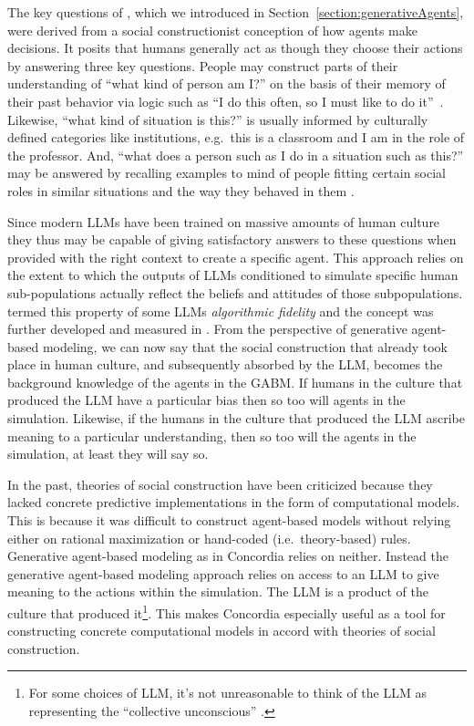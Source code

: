 \documentclass[11pt, a4paper, logo, twocolumn, internal, copyright, numbering]{googledeepmind}
\begin{document}
The key questions of \cite{march2011logic}, which we introduced in Section~\ref{section:generativeAgents}, were derived from a social constructionist conception of how agents make decisions. It posits that humans generally act as though they choose their actions by answering three key questions. People may construct parts of their understanding of ``what kind of person am I?'' on the basis of their memory of their past behavior via logic such as ``I do this often, so I must like to do it''~\citep{ouellette1998habit}. Likewise, ``what kind of situation is this?'' is usually informed by culturally defined categories like institutions, e.g.~this is a classroom and I am in the role of the professor. And, ``what does a person such as I do in a situation such as this?'' may be answered by recalling examples to mind of people fitting certain social roles in similar situations and the way they behaved in them \citep{sunstein1996social, harris2021role}.

Since modern LLMs have been trained on massive amounts of human culture they thus may be capable of giving satisfactory answers to these questions when provided with the right context to create a specific agent. This approach relies on the extent to which the outputs of LLMs conditioned to simulate specific human sub-populations actually reflect the beliefs and attitudes of those subpopulations. \cite{argyle2023out} termed this property of some LLMs \textit{algorithmic fidelity} and the concept was further developed and measured in \citep{amirova2023framework, santurkar2023whose}. From the perspective of generative agent-based modeling, we can now say that the social construction that already took place in human culture, and subsequently absorbed by the LLM, becomes the background knowledge of the agents in the GABM. If humans in the culture that produced the LLM have a particular bias then so too will agents in the simulation. Likewise, if the humans in the culture that produced the LLM ascribe meaning to a particular understanding, then so too will the agents in the simulation, at least they will say so.

In the past, theories of social construction have been criticized because they lacked concrete predictive implementations in the form of computational models. This is because it was difficult to construct agent-based models without relying either on rational maximization or hand-coded (i.e.~theory-based) rules. Generative agent-based modeling as in Concordia relies on neither. Instead the generative agent-based modeling approach relies on access to an LLM to give meaning to the actions within the simulation. The LLM is a product of the culture that produced it\footnote{For some choices of LLM, it's not unreasonable to think of the LLM as representing the ``collective unconscious'' \citep{jung1959archetypes}.}. This makes Concordia especially useful as a tool for constructing concrete computational models in accord with theories of social construction.
\end{document}
